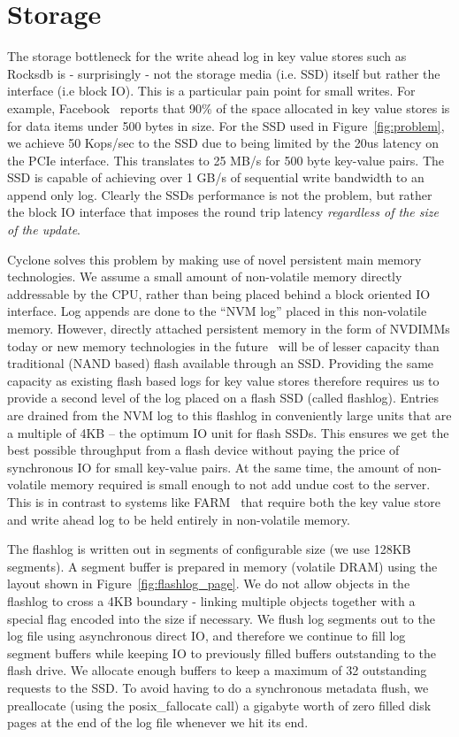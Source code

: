 \documentclass[letterpaper,twocolumn,10pt]{article}
\begin{document}
\section{Storage}
\label{sec:storage}
The storage bottleneck for the write ahead log in key value stores
such as Rocksdb is - surprisingly - not the storage media (i.e. SSD)
itself but rather the interface (i.e block IO). This is a particular
pain point for small writes.  For example,
Facebook~\cite{fb_workload_analysis} reports that 90\% of the space
allocated in key value stores is for data items under 500 bytes in
size. For the SSD used in Figure~\ref{fig:problem}, we achieve 50
Kops/sec to the SSD due to being limited by the 20us latency on the PCIe
interface. This translates to 25 MB/s for 500 byte key-value
pairs. The SSD is capable of achieving over 1 GB/s of sequential write
bandwidth to an append only log. Clearly the SSDs performance is not
the problem, but rather the block IO interface that imposes the round
trip latency \emph{regardless of the size of the update}.

Cyclone solves this problem by making use of novel persistent main
memory technologies. We assume a small amount of non-volatile memory
directly addressable by the CPU, rather than being placed behind a
block oriented IO interface. Log appends are done to the ``NVM log''
placed in this non-volatile memory. However, directly attached
persistent memory in the form of NVDIMMs today or new memory
technologies in the future~\cite{pmfs} will be of lesser capacity than
traditional (NAND based) flash available through an SSD. Providing the
same capacity as existing flash based logs for key value stores
therefore requires us to provide a second level of the log placed on a
flash SSD (called flashlog).  Entries are drained from the NVM log to
this flashlog in conveniently large units that are a multiple of 4KB
-- the optimum IO unit for flash SSDs. This ensures we get the best
possible throughput from a flash device without paying the price of
synchronous IO for small key-value pairs. At the same time, the amount
of non-volatile memory required is small enough to not add undue cost
to the server. This is in contrast to systems like FARM~\cite{farm}
that require both the key value store and write ahead log to be held
entirely in non-volatile memory.

The flashlog is written out in segments of configurable size (we use 128KB
segments). A segment buffer is prepared in memory (volatile DRAM) using the
layout shown in Figure~\ref{fig:flashlog_page}. We do not allow objects in the
flashlog to cross a 4KB boundary - linking multiple objects together with a
special flag encoded into the size if necessary. We flush log segments out to
the log file using asynchronous direct IO, and therefore we continue to fill log
segment buffers while keeping IO to previously filled buffers outstanding to the
flash drive. We allocate enough buffers to keep a maximum of 32 outstanding
requests to the SSD. To avoid having to do a synchronous metadata flush, we
preallocate (using the posix\_fallocate call) a gigabyte worth of zero filled
disk pages at the end of the log file whenever we hit its end.
\end{document}
